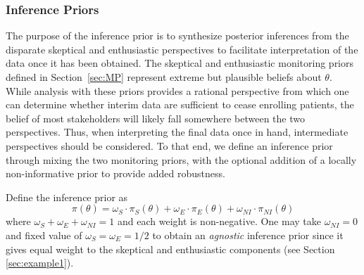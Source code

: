 \documentclass[AMA,STIX1COL,doublespace]{WileyNJD-v2}
\begin{document}
%

%



\subsubsection{Inference Priors}\label{sec:inferencepriors}
The purpose of the inference prior is to synthesize posterior inferences from the disparate skeptical and enthusiastic perspectives to 
facilitate interpretation of the data once it has been obtained. 
%
The skeptical and enthusiastic monitoring priors defined in Section~\ref{sec:MP} represent extreme but plausible 
beliefs about $\theta$.
%
While analysis with these priors provides a rational perspective from which one can determine whether interim data 
are sufficient to cease enrolling patients, the belief of most stakeholders will likely fall somewhere between the 
two perspectives.
%
Thus, when interpreting the final data once in hand, intermediate perspectives should be considered.
%
To that end, we define an inference prior through mixing the two monitoring priors, with the optional addition of a locally non-informative prior to provide added robustness.

{
Define the inference prior as
\begin{equation}\label{eq:3partmix}
\pi(\theta)=\omega_S\cdot \pi_S(\theta)+\omega_E\cdot\pi_E(\theta)+\omega_{NI}\cdot\pi_{NI}(\theta)
\end{equation}
where $\omega_S+\omega_E+\omega_{NI}=1$ and each weight is non-negative. 
One may take $\omega_{NI}=0$ and fixed value of $\omega_S=\omega_E=1/2$ to obtain an \textit{agnostic} inference prior since it 
gives equal weight to the skeptical and enthusiastic components (see Section \ref{sec:example1}).
%
}
\end{document}
